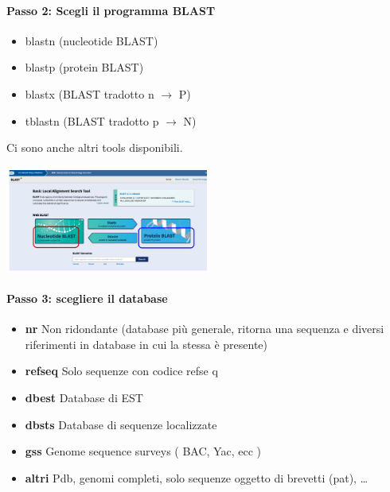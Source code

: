 \documentclass{article}
\begin{document}
\paragraph{Passo 2: Scegli il programma BLAST}
\begin{itemize}
    \item blastn (nucleotide BLAST)
    \item blastp (protein BLAST)
    \item blastx (BLAST tradotto n $\rightarrow$ P)
    \item tblastn (BLAST tradotto p $\rightarrow$ N)
\end{itemize}
Ci sono anche altri tools disponibili.
\begin{center}
    \includegraphics[width=0.5\textwidth]{figures/blast2.png}
\end{center}
\paragraph{Passo 3: scegliere il database}
\begin{itemize}
    \item \textbf{nr} 
        \subitem Non ridondante (database più generale,
        ritorna una sequenza e diversi riferimenti
        in database in cui la stessa è presente)
    \item \textbf{refseq}
        \subitem Solo sequenze con codice refse q
    \item \textbf{dbest} 
        \subitem Database di EST
    \item \textbf{dbsts}
        \subitem Database di sequenze localizzate
    \item \textbf{gss}
        \subitem Genome sequence surveys ( BAC, Yac, ecc )
    \item \textbf{altri}
        \subitem Pdb, genomi completi, solo sequenze oggetto
        di brevetti (pat), \dots
\end{itemize}
\end{document}
